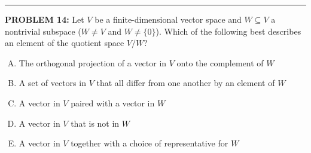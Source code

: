 \documentclass[12pt]{amsart}
\newcommand{\divider}{
  \vspace{-1em} %
  \noindent
  \raisebox{-0.15ex}{\textbullet}%
  \hspace{0.5em}%
  \rule[0.5ex]{0.95\textwidth}{1.0pt}%
  \hspace{0.5em}%
  \raisebox{-0.15ex}{\textbullet}%
  \vspace{0em} %
}
\begin{document}
%
\divider

{\bf PROBLEM 14:}
%
Let $V$ be a finite-dimensional vector space and $W \subseteq V$ a nontrivial subspace ($W\neq V$ and $W\neq\{0\}$). 
Which of the following best describes an element of the quotient space $V/W$?

\begin{enumerate}[(A)]
\item The orthogonal projection of a vector in $V$ onto the complement of $W$
\item A set of vectors in $V$ that all differ from one another by an element of $W$
\item A vector in $V$ paired with a vector in $W$
\item A vector in $V$ that is not in $W$
\item A vector in $V$ together with a choice of representative for $W$
\end{enumerate}
\end{document}
